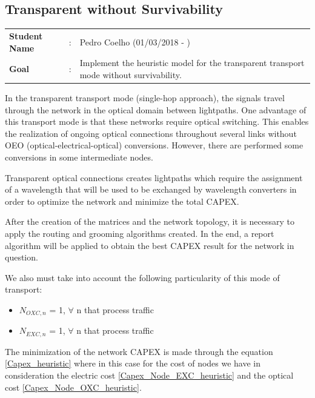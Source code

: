 \clearpage

\subsection{Transparent without Survivability}\label{heuristic_Transp_Survivability}
\begin{tcolorbox}	
\begin{tabular}{p{2.75cm} p{0.2cm} p{10.5cm}} 	
\textbf{Student Name}  &:& Pedro Coelho    (01/03/2018 - )\\
\textbf{Goal}          &:& Implement the heuristic model for the transparent transport mode without survivability.
\end{tabular}
\end{tcolorbox}

\vspace{11pt}
In the transparent transport mode (single-hop approach), the signals travel through the network in the optical domain between lightpaths. One advantage of this transport mode is that these networks require optical switching. This enables the realization of ongoing optical connections throughout several links without OEO (optical-electrical-optical) conversions. However, there are performed some conversions in some intermediate nodes.

Transparent optical connections creates lightpaths which require the assignment of a wavelength that will be used to be exchanged by wavelength converters in order to optimize the network and minimize the total CAPEX.

After the creation of the matrices and the network topology, it is necessary to apply the routing and grooming algorithms created. In the end, a report algorithm will be applied to obtain the best CAPEX result for the network in question.

We also must take into account the following particularity of this mode of transport:
\begin{itemize}
  \item $N_{OXC,n}$ = 1, \quad $\forall$ n that process traffic
  \item $N_{EXC,n}$ = 1, \quad $\forall$ n that process traffic
\end{itemize}

The minimization of the network CAPEX is made through the equation \ref{Capex_heuristic} where in this case for the cost of nodes we have in consideration the electric cost \ref{Capex_Node_EXC_heuristic} and the optical cost \ref{Capex_Node_OXC_heuristic}.\\

